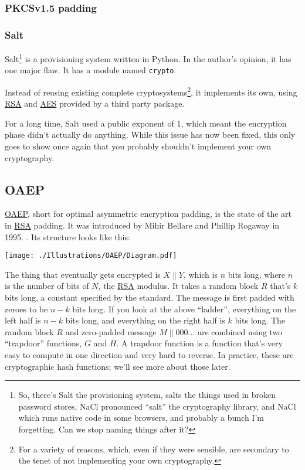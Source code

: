 \documentclass[11pt,ebook,table,dvipsnames]{memoir}
\begin{document}
\subsubsection{PKCSv1.5 padding}
\label{sec-2-5-3-3-1}

\subsubsection{Salt}
\label{sec-2-5-3-3-2}

Salt\footnote{So, there's Salt the provisioning system, salts the things
used in broken password stores, NaCl pronounced \enquote{salt} the
cryptography library, and NaCl which runs native code in some
browsers, and probably a bunch I'm forgetting. Can we stop naming
things after it?} is a provisioning system written in Python. In the
author's opinion, it has one major flaw. It has a module named
\texttt{crypto}.

Instead of reusing existing complete cryptosystems\footnote{For a variety
of reasons, which, even if they were sensible, are secondary to the
tenet of not implementing your own cryptography.}, it implements its
own, using \hyperref[RSA]{RSA} and \hyperref[AES]{AES} provided by a third party package.

For a long time, Salt used a public exponent of 1, which meant the
encryption phase didn't actually do anything. While this issue has
now been fixed, this only goes to show once again that you probably
shouldn't implement your own cryptography.


\subsection{\label{OAEP}OAEP}
\label{sec-2-5-3-4}

\hyperref[OAEP]{OAEP}, short for optimal asymmetric encryption padding, is the state of
the art in \hyperref[RSA]{RSA} padding. It was introduced by Mihir Bellare and Phillip
Rogaway in 1995. \cite{bellarerogaway:oaep}. Its structure looks like
this:

\texttt{[image: ./Illustrations/OAEP/Diagram.pdf]}

The thing that eventually gets encrypted is $X \| Y$, which is $n$
bits long, where $n$ is the number of bits of $N$, the \hyperref[RSA]{RSA} modulus. It
takes a random block $R$ that's $k$ bits long, a constant specified by
the standard. The message is first padded with zeroes to be $n - k$
bits long. If you look at the above \enquote{ladder}, everything on the left
half is $n - k$ bits long, and everything on the right half is $k$
bits long. The random block $R$ and zero-padded message $M \|
000\ldots$ are combined using two \enquote{trapdoor} functions, $G$ and $H$. A
trapdoor function is a function that's very easy to compute in one
direction and very hard to reverse. In practice, these are
cryptographic hash functions; we'll see more about those later.
\end{document}
